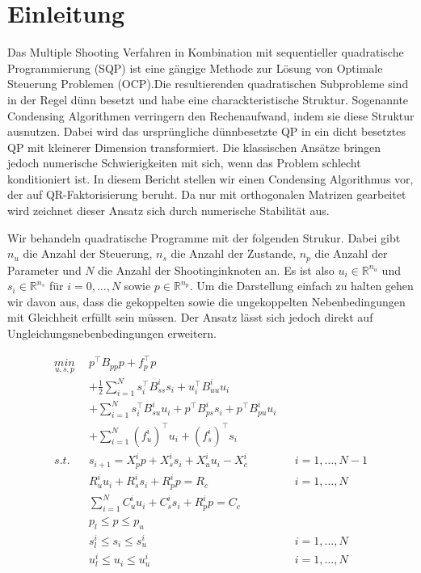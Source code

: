 \section{Einleitung}
Das Multiple Shooting Verfahren in Kombination mit sequentieller quadratische Programmierung (SQP) ist eine gängige Methode zur Lösung von Optimale Steuerung Problemen (OCP).Die resultierenden quadratischen Subprobleme sind in der Regel dünn besetzt und habe eine charackteristische Struktur. Sogenannte Condensing Algorithmen verringern den Rechenaufwand, indem sie diese Struktur ausnutzen. Dabei wird das ursprüngliche dünnbesetzte QP in ein dicht besetztes QP mit kleinerer Dimension transformiert. Die klassischen Ansätze bringen jedoch numerische Schwierigkeiten mit sich, wenn das Problem schlecht konditioniert ist. In diesem Bericht stellen wir einen Condensing Algorithmus vor, der auf QR-Faktorisierung beruht. Da nur mit orthogonalen Matrizen gearbeitet wird zeichnet dieser Ansatz sich durch numerische Stabilität aus.

Wir behandeln quadratische Programme mit der folgenden Strukur. Dabei gibt $n_u$ die Anzahl der Steuerung, $n_s$ die Anzahl der Zustande, $n_p$ die Anzahl der Parameter und $N$ die Anzahl der Shootinginknoten an. Es ist also $u_i \in \mathbb{R}^{n_u}$ und $s_i \in \mathbb{R}^{n_s}$ für $i=0, \hdots, N$ sowie $p \in \mathbb{R}^{n_p}$. Um die Darstellung einfach zu halten gehen wir davon aus, dass die gekoppelten sowie die ungekoppelten Nebenbedingungen mit Gleichheit erfüllt sein müssen. Der Ansatz lässt sich jedoch direkt auf Ungleichungsnebenbedingungen erweitern.

\begin{align*}
\underset{u,s,p}{min}\ \	&p^\top B_{pp} p+f_p^\top p  \\ 
						&+\frac{1}{2}\sum_{i=1}^{N} s_i^\top B_{ss}^i s_i+u_i^\top B_{uu}^i u_i \\
						&+\sum_{i=1}^{N} s_i^\top B^i_{su} u_i+p^\top B_{ps}^i s_i +p^\top B_{pu}^i u_i  \\
						&+\sum_{i=1}^{N} (f_u^i)^\top u_i+(f_s^i)^\top s_i \\
s.t. 	\ \				&s_{i+1}=X_p^i p +X_s^i s_i + X_u^i u_i -X_c^i  		&& i=1,\hdots,N-1\\
						& R_u^i u_i + R_s^i s_i+R_p^i p =R_c   		&& i=1,\hdots,N \\
						& \sum_{i=1}^{N} C_u^i u_i + C_s^i s_i + R_p^i p = C_c \\
						& p_l \leq p \leq p_u \\
						& s_l^i \leq s_i \leq s_u^i && i=1,\hdots,N \\ 
						& u_l^i \leq u_i  \leq u_u^i  && i=1,\hdots,N
\end{align*}


